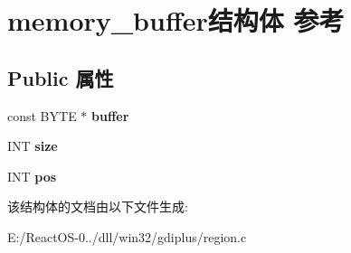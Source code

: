 \hypertarget{structmemory__buffer}{}\section{memory\+\_\+buffer结构体 参考}
\label{structmemory__buffer}
\subsection*{Public 属性}
\begin{DoxyCompactItemize}
\item 
\mbox{\label{structmemory__buffer_aeef930de3359af626baee6e647e219e3}} 
const B\+Y\+TE $\ast$ {\bfseries buffer}
\item 
\mbox{\label{structmemory__buffer_aa7ff177c2ff4dc3b4bced1b906bbc3e4}} 
I\+NT {\bfseries size}
\item 
\mbox{\label{structmemory__buffer_a6d8ec51adc8ce24b8d4acca1edfca79d}} 
I\+NT {\bfseries pos}
\end{DoxyCompactItemize}


该结构体的文档由以下文件生成\+:\begin{DoxyCompactItemize}
\item 
E\+:/\+React\+O\+S-\/0../dll/win32/gdiplus/region.\+c\end{DoxyCompactItemize}

